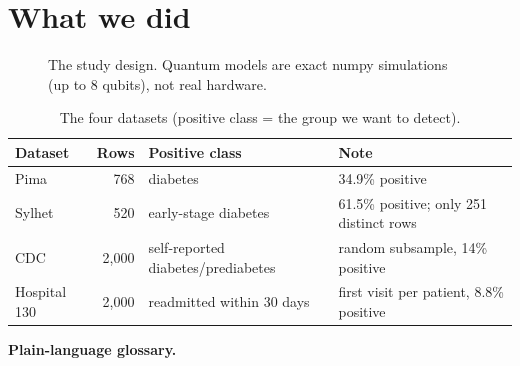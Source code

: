 \documentclass[11pt,a4paper]{article}
\begin{document}
\section{What we did}
\begin{figure}[H]\centering
{}\caption{The study design. Quantum models are exact numpy simulations (up to 8 qubits), not real hardware.}\end{figure}
\begin{table}[H]\centering\small\caption{The four datasets (positive class = the group we want to detect).}
\begin{tabular}{lrll}\toprule Dataset & Rows & Positive class & Note\\\midrule
Pima & 768 & diabetes & 34.9\% positive\\
Sylhet & 520 & early-stage diabetes & 61.5\% positive; only 251 distinct rows\\
CDC & 2,000 & self-reported diabetes/prediabetes & random subsample, 14\% positive\\
Hospital 130 & 2,000 & readmitted within 30 days & first visit per patient, 8.8\% positive\\\bottomrule\end{tabular}\end{table}
\textbf{Plain-language glossary.}
\end{document}
